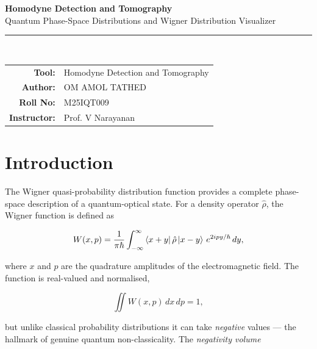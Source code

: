 \documentclass[12pt,a4paper]{article}
\begin{document}
\begin{titlepage}
  \centering
  \vspace*{2cm}
  {\Huge\bfseries\color{deepblue} Homodyne Detection and Tomography}\\[0.6em]
  {\large\color{deepblue!80} Quantum Phase-Space Distributions and Wigner Distribution Visualizer}\\[2em]
  \rule{0.6\textwidth}{1pt}\\[2em]
  \begin{tabular}{rl}
    \textbf{Tool:}    & Homodyne Detection and Tomography \\[4pt]
    \textbf{Author:}  & OM AMOL TATHED \\[4pt]
    \textbf{Roll No:}    & M25IQT009 \\[4pt]
    \textbf{Instructor:} & Prof. V Narayanan
  \end{tabular}
  \vfill
\end{titlepage}

\tableofcontents
\newpage

\section{Introduction}

The Wigner quasi-probability distribution function provides a complete phase-space description of a quantum-optical state. For a density operator $\hat{\rho}$, the Wigner function is defined as

\begin{equation}
  W(x,p) = \frac{1}{\pi\hbar} \int_{-\infty}^{\infty}
            \bra{x+y}\hat{\rho}\ket{x-y}\,e^{2ipy/\hbar}\,dy,
  \label{eq:wigner_def}
\end{equation}

where $x$ and $p$ are the quadrature amplitudes of the electromagnetic field. The function is real-valued and normalised,

\begin{equation}
  \iint W(x,p)\,dx\,dp = 1,
\end{equation}

but unlike classical probability distributions it can take \emph{negative} values — the hallmark of genuine quantum non-classicality. The \textit{negativity volume}
\end{document}
